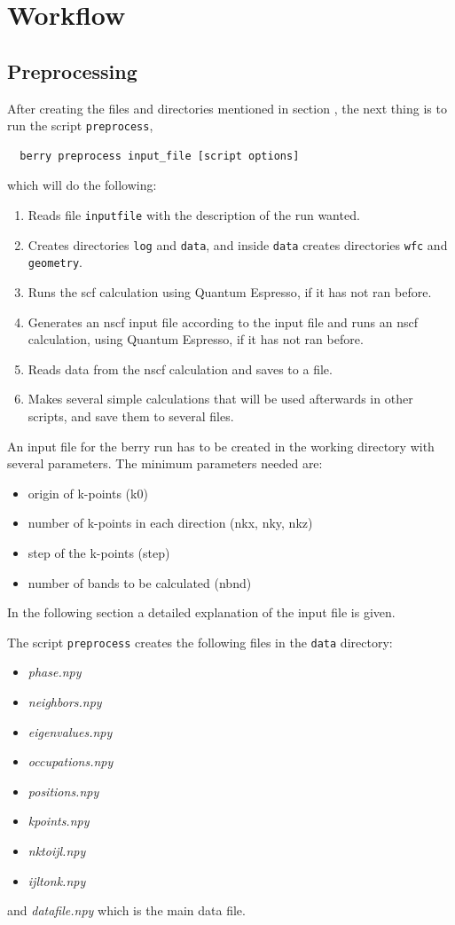 \documentclass[a4paper,12pt]{report}
\begin{document}
\chapter{Workflow}\label{ch:workflow}



\section{Preprocessing}\label{sec:preprocessing}
 After creating the files and directories mentioned in section , the next thing is
 to run the script \texttt{preprocess},
 \begin{verbatim}
  berry preprocess input_file [script options]
 \end{verbatim}
 which will do the following:
 \begin{enumerate}
  \item Reads file \texttt{inputfile} with the description of the run wanted.
  \item Creates directories \verb|log| and \verb|data|, and inside \verb|data|
  creates directories \verb|wfc| and \verb|geometry|.
  \item Runs the scf calculation using {\sc Quantum Espresso}, if it has not ran before.
  \item Generates an nscf input file according to the input file and runs an nscf calculation,
  using {\sc Quantum Espresso}, if it has not ran before.
  \item Reads data from the nscf calculation and saves to a file.
  \item Makes several simple calculations that will be used afterwards in other scripts,
  and save them to several files.
 \end{enumerate}

 An input file for the berry run has to be created in the working directory with several parameters.
The minimum parameters needed are:
\begin{itemize}
 \item origin of k-points (k0)
 \item number of k-points in each direction (nkx, nky, nkz)
 \item step of the k-points (step)
 \item number of bands to be calculated (nbnd)
\end{itemize}
 In the following section a detailed explanation of the input file is given.

The script \texttt{preprocess} creates the following files in the \verb|data| directory:
\begin{itemize}
 \item \emph{phase.npy}
 \item \emph{neighbors.npy}
 \item \emph{eigenvalues.npy}
 \item \emph{occupations.npy}
 \item \emph{positions.npy}
 \item \emph{kpoints.npy}
 \item \emph{nktoijl.npy}
 \item \emph{ijltonk.npy}
\end{itemize}
and \emph{datafile.npy} which is the main data file.
\end{document}
